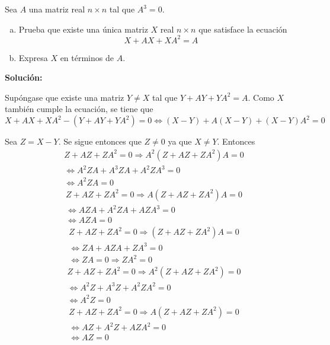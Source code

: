 \documentclass[../../main.tex]{subfiles}
\begin{document}
  \begin{shaded}
    Sea $A$ una matriz real $n \times n$ tal que $A^3 = 0$.

    \begin{enumerate}[(a)]
      \item Prueba que existe una única matriz $X$ real $n \times n$ que satisface la ecuación
      $$
      X + A X + X A^2 = A
      $$
      \item Expresa $X$ en términos de $A$.
    \end{enumerate}
  \end{shaded}

  \textbf{Solución:}

  Supóngase que existe una matriz $Y \ne X$ tal que $Y + A Y + Y A^2 = A$. Como $X$ también cumple la ecuación, se tiene que
  $$
  X + A X + X A^2 - (Y + A Y + Y A^2) = 0 \iff (X - Y) + A (X - Y) + (X - Y) A^2 = 0
  $$

  Sea $Z = X - Y$. Se sigue entonces que $Z \ne 0$ ya que $X \ne Y$. Entonces
  \begin{equation*}
    \begin{split}
      Z + A Z + Z A^2 = 0 \Longrightarrow
      A^2 (Z + A Z + Z A^2) A = 0 \\ \iff
      A^2 Z A + A^3 Z A + A^2 Z A^3 = 0 \\ \iff
      A^2 Z A = 0
    \end{split}
  \end{equation*}
  \begin{equation*}
    \begin{split}
      Z + A Z + Z A^2 = 0 \Longrightarrow
      A (Z + A Z + Z A^2) A = 0 \\ \iff
      A Z A + A^2 Z A + A Z A^3 = 0 \\ \iff
      A Z A = 0
    \end{split}
  \end{equation*}
  \begin{equation*}
    \begin{split}
      Z + A Z + Z A^2 = 0 \Longrightarrow
      (Z + A Z + Z A^2) A = 0 \\ \iff
      Z A + A Z A + Z A^3 = 0 \\ \iff
      Z A = 0 \Longrightarrow Z A^2 = 0
    \end{split}
  \end{equation*}
  \begin{equation*}
    \begin{split}
      Z + A Z + Z A^2 = 0 \Longrightarrow
      A^2 (Z + A Z + Z A^2) = 0 \\ \iff
      A^2 Z + A^3 Z + A^2 Z A^2 = 0 \\ \iff
      A^2 Z = 0
    \end{split}
  \end{equation*}
  \begin{equation*}
    \begin{split}
      Z + A Z + Z A^2 = 0 \Longrightarrow
      A (Z + A Z + Z A^2) = 0 \\ \iff
      A Z + A^2 Z + A Z A^2 = 0 \\ \iff
      A Z = 0
    \end{split}
  \end{equation*}
\end{document}
